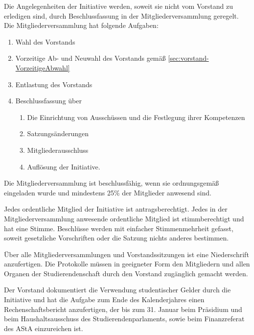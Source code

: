 \begin{contract}
Die Angelegenheiten der Initiative werden, soweit sie nicht vom Vorstand zu erledigen sind, durch Beschlussfassung in der Mitgliederversammlung geregelt.
Die Mitgliederversammlung hat folgende Aufgaben:
\begin{enumerate}[label={(\arabic*)}]
    \item Wahl des Vorstands
    \item Vorzeitige Ab- und Neuwahl des Vorstands gemäß \ref{sec:vorstand-VorzeitigeAbwahl}
    \item Entlastung des Vorstands
    \item Beschlussfassung über
    \begin{enumerate}[label={\arabic*.}]
        \item  Die Einrichtung von Ausschüssen und die Festlegung ihrer Kompetenzen
        \item Satzungsänderungen
        \item Mitgliederausschluss
        \item Auflösung der Initiative.
    \end{enumerate}
\end{enumerate}



\label{sec:beschlussfassungMitgliederversammlung}

Die Mitgliederversammlung ist beschlussfähig, wenn sie ordnungsgemäß eingeladen wurde und mindestens 25\% der Mitglieder anwesend sind.

Jedes ordentliche Mitglied der Initiative ist antragsberechtigt. Jedes in der Mitgliederversammlung anwesende ordentliche Mitglied ist stimmberechtigt und hat eine Stimme. Beschlüsse werden mit einfacher Stimmenmehrheit gefasst, soweit gesetzliche Vorschriften oder die Satzung nichts anderes bestimmen.



\label{sec:niederschrift}

Über alle Mitgliederversammlungen und Vorstandssitzungen ist eine Niederschrift anzufertigen. Die Protokolle müssen in geeigneter Form den Mitgliedern und allen Organen der Studierendenschaft durch den Vorstand zugänglich gemacht werden.


\label{sec:rechenschaftsbericht}

Der Vorstand dokumentiert die Verwendung studentischer Gelder durch die Initiative und hat die Aufgabe zum Ende des Kalenderjahres einen Rechenschaftsbericht anzufertigen, der bis zum 31. Januar beim Präsidium und beim Haushaltsausschuss des Studierendenparlaments, sowie beim Finanzreferat des AStA einzureichen ist.



\end{contract}
